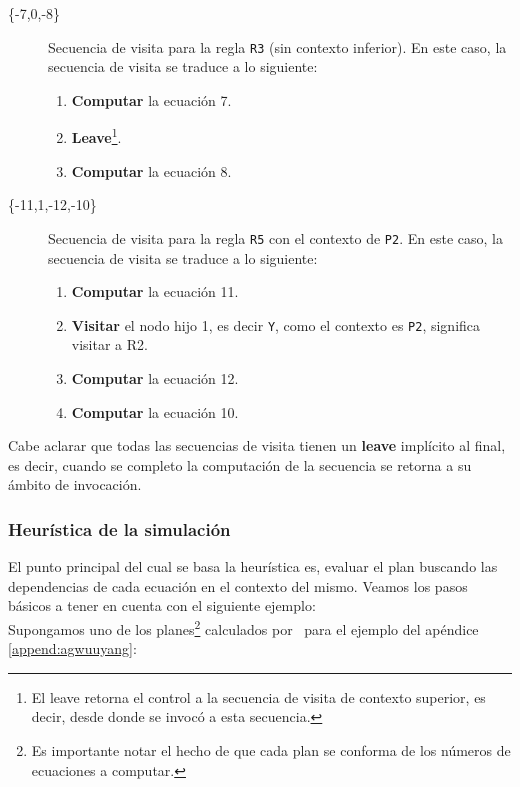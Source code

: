 \begin{description}
\item [\{-7,0,-8\}] Secuencia de visita para la regla \texttt{R3} (sin contexto inferior). En este caso, la secuencia de visita se traduce a lo siguiente:

\begin{enumerate}
\item \textbf{Computar} la ecuación 7.
\item \textbf{Leave}\footnote{El leave retorna el control a la secuencia de visita de contexto superior, es decir, desde donde se invocó a esta secuencia.}.
\item \textbf{Computar} la ecuación 8.
\end{enumerate}

\item [\{-11,1,-12,-10\}] Secuencia de visita para la regla \texttt{R5} con el contexto de \texttt{P2}. En este caso, la secuencia de visita se traduce a lo siguiente:

\begin{enumerate}
\item \textbf{Computar} la ecuación 11.
\item \textbf{Visitar} el nodo hijo 1, es decir \texttt{Y}, como el contexto es \texttt{P2}, significa visitar a R2.
\item \textbf{Computar} la ecuación 12.
\item \textbf{Computar} la ecuación 10.
\end{enumerate}
\end{description}

Cabe aclarar que todas las secuencias de visita tienen un \textbf{leave} implícito al final, es decir, cuando se completo la computación de la secuencia se retorna a su ámbito de invocación.

\subsubsection*{Heurística de la simulación}

El punto principal del cual se basa la heurística es, evaluar el plan buscando las dependencias de cada ecuación en el contexto del mismo. Veamos los pasos básicos a tener en cuenta con el siguiente ejemplo:\\

Supongamos uno de los planes\footnote{Es importante notar el hecho de que cada plan se conforma de los números de ecuaciones a computar.} calculados por \maggen\ para el ejemplo del apéndice \ref{append:agwuuyang}:\\

